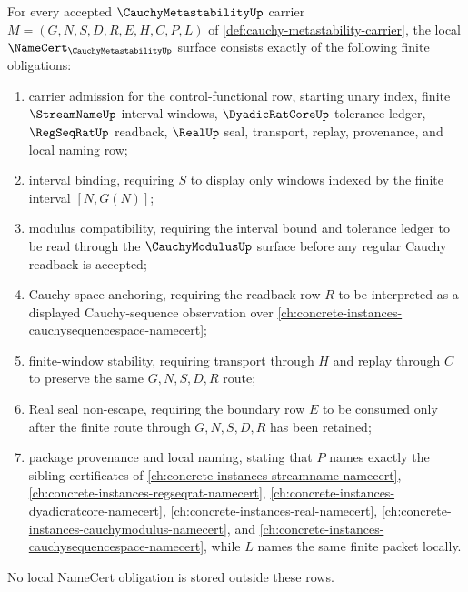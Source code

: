 \begin{theorem}
\label{thm:cauchy-metastability-namecert-obligations}
For every accepted $\CauchyMetastabilityUp$ carrier $M=(G,N,S,D,R,E,H,C,P,L)$ of \autoref{def:cauchy-metastability-carrier}, the local $\NameCert_{\CauchyMetastabilityUp}$ surface consists exactly of the following finite obligations:
\begin{enumerate}
\item carrier admission for the control-functional row, starting unary index, finite $\StreamNameUp$ interval windows, $\DyadicRatCoreUp$ tolerance ledger, $\RegSeqRatUp$ readback, $\RealUp$ seal, transport, replay, provenance, and local naming row;
\item interval binding, requiring $S$ to display only windows indexed by the finite interval $[N,G(N)]$;
\item modulus compatibility, requiring the interval bound and tolerance ledger to be read through the $\CauchyModulusUp$ surface before any regular Cauchy readback is accepted;
\item Cauchy-space anchoring, requiring the readback row $R$ to be interpreted as a displayed Cauchy-sequence observation over \autoref{ch:concrete-instances-cauchysequencespace-namecert};
\item finite-window stability, requiring transport through $H$ and replay through $C$ to preserve the same $G,N,S,D,R$ route;
\item Real seal non-escape, requiring the boundary row $E$ to be consumed only after the finite route through $G,N,S,D,R$ has been retained;
\item package provenance and local naming, stating that $P$ names exactly the sibling certificates of \autoref{ch:concrete-instances-streamname-namecert}, \autoref{ch:concrete-instances-regseqrat-namecert}, \autoref{ch:concrete-instances-dyadicratcore-namecert}, \autoref{ch:concrete-instances-real-namecert}, \autoref{ch:concrete-instances-cauchymodulus-namecert}, and \autoref{ch:concrete-instances-cauchysequencespace-namecert}, while $L$ names the same finite packet locally.
\end{enumerate}
No local NameCert obligation is stored outside these rows.
\end{theorem}

